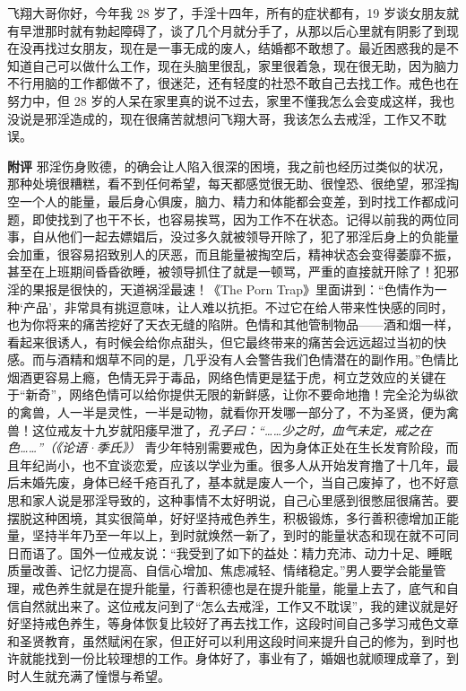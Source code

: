 \begin{case}
    飞翔大哥你好，今年我 28 岁了，手淫十四年，所有的症状都有，19 岁谈女朋友就有早泄那时就有勃起障碍了，谈了几个月就分手了，从那以后心里就有阴影了到现在没再找过女朋友，现在是一事无成的废人，结婚都不敢想了。最近困惑我的是不知道自己可以做什么工作，现在头脑里很乱，家里很着急，现在很无助，因为脑力不行用脑的工作都做不了，很迷茫，还有轻度的社恐不敢自己去找工作。戒色也在努力中，但 28 岁的人呆在家里真的说不过去，家里不懂我怎么会变成这样，我也没说是邪淫造成的，现在很痛苦就想问飞翔大哥，我该怎么去戒淫，工作又不耽误。

    \textbf{附评} 邪淫伤身败德，的确会让人陷入很深的困境，我之前也经历过类似的状况，那种处境很糟糕，看不到任何希望，每天都感觉很无助、很惶恐、很绝望，邪淫掏空一个人的能量，最后身心俱废，脑力、精力和体能都会变差，到时找工作都成问题，即使找到了也干不长，也容易挨骂，因为工作不在状态。记得以前我的两位同事，自从他们一起去嫖娼后，没过多久就被领导开除了，犯了邪淫后身上的负能量会加重，很容易招致别人的厌恶，而且能量被掏空后，精神状态会变得萎靡不振，甚至在上班期间昏昏欲睡，被领导抓住了就是一顿骂，严重的直接就开除了！犯邪淫的果报是很快的，天道祸淫最速！《The Porn Trap》里面讲到：“色情作为一种‘产品’，非常具有挑逗意味，让人难以抗拒。不过它在给人带来性快感的同时，也为你将来的痛苦挖好了天衣无缝的陷阱。色情和其他管制物品——酒和烟一样，看起来很诱人，有时候会给你点甜头，但它最终带来的痛苦会远远超过当初的快感。而与酒精和烟草不同的是，几乎没有人会警告我们色情潜在的副作用。”色情比烟酒更容易上瘾，色情无异于毒品，网络色情更是猛于虎，柯立芝效应的关键在于“新奇”，网络色情可以给你提供无限的新鲜感，让你不要命地撸！完全沦为纵欲的禽兽，人一半是灵性，一半是动物，就看你开发哪一部分了，不为圣贤，便为禽兽！这位戒友十九岁就阳痿早泄了，\textit{孔子曰：“……少之时，血气未定，戒之在色……”（《论语·季氏》）} 青少年特别需要戒色，因为身体正处在生长发育阶段，而且年纪尚小，也不宜谈恋爱，应该以学业为重。很多人从开始发育撸了十几年，最后未婚先废，身体已经千疮百孔了，基本就是废人一个，当自己废掉了，也不好意思和家人说是邪淫导致的，这种事情不太好明说，自己心里感到很憋屈很痛苦。要摆脱这种困境，其实很简单，好好坚持戒色养生，积极锻炼，多行善积德增加正能量，坚持半年乃至一年以上，到时就焕然一新了，到时的能量状态和现在就不可同日而语了。国外一位戒友说：“我受到了如下的益处：精力充沛、动力十足、睡眠质量改善、记忆力提高、自信心增加、焦虑减轻、情绪稳定。”男人要学会能量管理，戒色养生就是在提升能量，行善积德也是在提升能量，能量上去了，底气和自信自然就出来了。这位戒友问到了“怎么去戒淫，工作又不耽误”，我的建议就是好好坚持戒色养生，等身体恢复比较好了再去找工作，这段时间自己多学习戒色文章和圣贤教育，虽然赋闲在家，但正好可以利用这段时间来提升自己的修为，到时也许就能找到一份比较理想的工作。身体好了，事业有了，婚姻也就顺理成章了，到时人生就充满了憧憬与希望。
\end{case}


